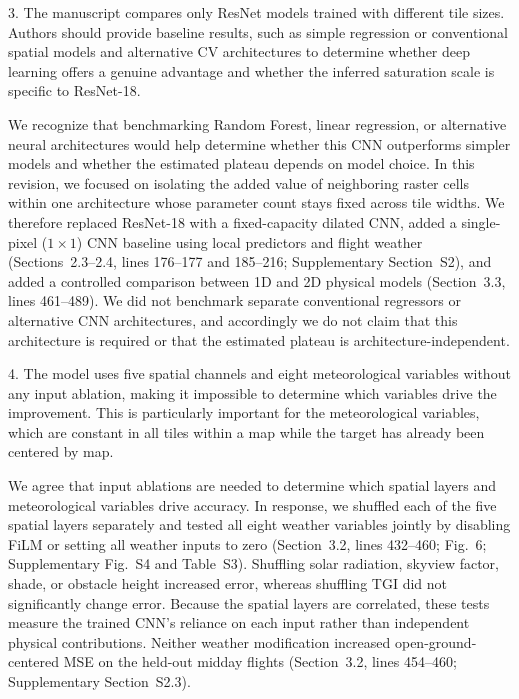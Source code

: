 \documentclass[12pt,english]{reviewresponse}
\begin{document}
\begin{revcomment}
3. The manuscript compares only ResNet models trained with different tile sizes. Authors should provide baseline results, such as simple regression or conventional spatial models and alternative CV architectures to determine whether deep learning offers a genuine advantage and whether the inferred saturation scale is specific to ResNet-18.
\end{revcomment}

\begin{revresponse}
We recognize that benchmarking Random Forest, linear regression, or alternative neural architectures would help determine whether this CNN outperforms simpler models and whether the estimated plateau depends on model choice. In this revision, we focused on isolating the added value of neighboring raster cells within one architecture whose parameter count stays fixed across tile widths. We therefore replaced ResNet-18 with a fixed-capacity dilated CNN, added a single-pixel ($1\times 1$) CNN baseline using local predictors and flight weather (Sections~2.3--2.4, lines 176--177 and 185--216; Supplementary Section~S2), and added a controlled comparison between 1D and 2D physical models (Section~3.3, lines 461--489). We did not benchmark separate conventional regressors or alternative CNN architectures, and accordingly we do not claim that this architecture is required or that the estimated plateau is architecture-independent.
\end{revresponse}

\begin{revcomment}
4. The model uses five spatial channels and eight meteorological variables without any input ablation, making it impossible to determine which variables drive the improvement. This is particularly important for the meteorological variables, which are constant in all tiles within a map while the target has already been centered by map.
\end{revcomment}

\begin{revresponse}
We agree that input ablations are needed to determine which spatial layers and meteorological variables drive accuracy. In response, we shuffled each of the five spatial layers separately and tested all eight weather variables jointly by disabling FiLM or setting all weather inputs to zero (Section~3.2, lines 432--460; Fig.~6; Supplementary Fig.~S4 and Table~S3). Shuffling solar radiation, skyview factor, shade, or obstacle height increased error, whereas shuffling TGI did not significantly change error. Because the spatial layers are correlated, these tests measure the trained CNN's reliance on each input rather than independent physical contributions. Neither weather modification increased open-ground-centered MSE on the held-out midday flights (Section~3.2, lines 454--460; Supplementary Section~S2.3).
\end{revresponse}
\end{document}
